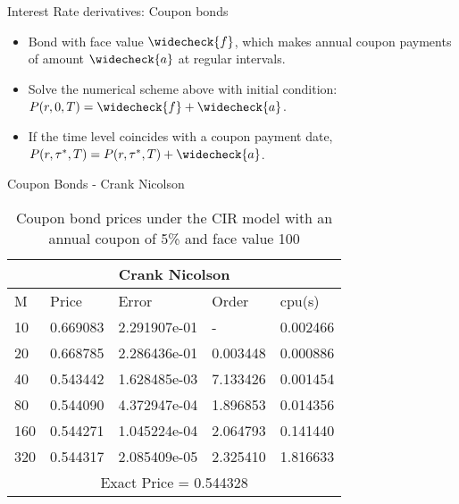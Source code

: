 \documentclass{beamer}
\begin{document}
\begin{frame}{Interest Rate derivatives: Coupon bonds}
\begin{itemize}
    \item Bond with face value $\widecheck{f}$, which makes annual coupon payments of amount $\widecheck{a}$ at regular intervals.
    \item Solve the numerical scheme above with initial condition: $P(r,0,T)=\widecheck{f} + \widecheck{a}$.
    \item If the time level coincides with a coupon payment date,  $P(r,\tau^{*}, T) = P(r,\tau^{*}, T) + \widecheck{a}$.
\end{itemize}
 
\end{frame}
 
 
 \begin{frame}{Coupon Bonds - Crank Nicolson}
    \begin{table}[htp]
    \begin{tabular}{ |p{1cm}|p{1.7cm}|p{2.5cm}|p{2cm}|p{1.5cm}|  }
    
     \hline
     \multicolumn{5}{|c|}{Crank Nicolson} \\
     \hline
     M & Price & Error & Order & cpu(s)\\
     \hline
    10 & 0.669083 & 2.291907e-01 &  - & 0.002466\\
    20 & 0.668785 & 2.286436e-01 & 0.003448 & 0.000886\\
    40 & 0.543442 & 1.628485e-03 & 7.133426 & 0.001454\\
    80 & 0.544090 & 4.372947e-04 & 1.896853 & 0.014356\\
    160 & 0.544271 & 1.045224e-04 & 2.064793 & 0.141440\\
    320 & 0.544317 & 2.085409e-05 & 2.325410 & 1.816633\\
     \hline
     \multicolumn{5}{|c|}{Exact Price = 0.544328} \\
     \hline
     
    \end{tabular}
    \caption{ Coupon bond prices under the CIR model with an annual coupon of 5\% and face value 100}
        
    \end{table}
\end{frame}
\end{document}
